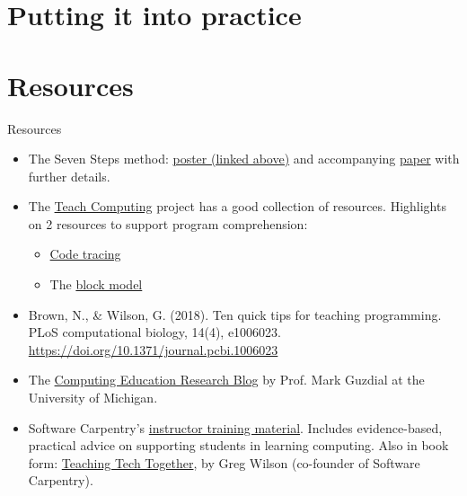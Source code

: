 \documentclass[10pt]{beamer}
\begin{document}
\section{Putting it into practice}

\section{Resources}

\begin{frame}{Resources}
    \begin{itemize}
        \item The Seven Steps method: \href{http://adhilton.pratt.duke.edu/sites/adhilton.pratt.duke.edu/files/u37/iticse-7steps.pdf}{poster (linked above)} and accompanying \href{https://dl.acm.org/doi/10.1145/3300115.3309508}{paper} with further details.
        \item The \href{https://teachcomputing.org/pedagogy}{Teach Computing} project has a good collection of resources. Highlights on 2 resources to support program comprehension:
            \begin{itemize}
                \item \href{https://blog.teachcomputing.org/code-tracing/}{Code tracing}
                \item The \href{https://blog.teachcomputing.org/quick-read-understanding-program-comprehension-using-the-block-model/}{block model}
            \end{itemize}
        \item Brown, N., \& Wilson, G. (2018). Ten quick tips for teaching programming. PLoS computational biology, 14(4), e1006023. \url{https://doi.org/10.1371/journal.pcbi.1006023}
        \item The \href{https://computinged.wordpress.com/about/}{Computing Education Research Blog} by Prof. Mark Guzdial at the University of Michigan.
        \item Software Carpentry's \href{https://carpentries.github.io/instructor-training/}{instructor training material}. Includes evidence-based, practical advice on supporting students in learning computing. Also in book form: \href{https://teachtogether.tech/en/index.html}{Teaching Tech Together}, by Greg Wilson (co-founder of Software Carpentry).
    \end{itemize}
\end{frame}
\end{document}
